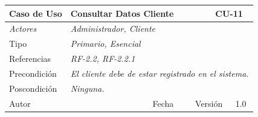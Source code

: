
\begin{table}[H]
    \begin{tabular}{|llllllll|}
    \hline
    \multicolumn{1}{|l|}{\cellcolor[HTML]{F2F2F2}Caso de Uso}           & \multicolumn{5}{l|}{Consultar Datos Cliente}                                                                       & \multicolumn{2}{l|}{\cellcolor[HTML]{E6E6E6}CU-11}             \\ \hline
    \multicolumn{1}{|l|}{{\color[HTML]{808080} \textit{Actores}}}       & \multicolumn{7}{l|}{{\color[HTML]{808080} \textit{Administrador, Cliente}}}                                                                                                      \\ \hline
    \multicolumn{1}{|l|}{Tipo}                                          & \multicolumn{7}{l|}{{\color[HTML]{808080} \textit{Primario, Esencial}}}                                                                                                                           \\ \hline
    \multicolumn{1}{|l|}{Referencias}                                   & \multicolumn{2}{l|}{{\color[HTML]{808080} \textit{RF-2.2, RF-2.2.1}}}                & \multicolumn{5}{l|}{}                                                                                                \\ \hline
    \multicolumn{1}{|l|}{Precondici\'on}                                  & \multicolumn{7}{l|}{{\color[HTML]{808080} \textit{El cliente debe de estar registrado en el sistema.}}}                                                                                                      \\ \hline
    \multicolumn{1}{|l|}{Poscondici\'on}                                  & \multicolumn{7}{l|}{{\color[HTML]{808080} \textit{Ninguna.}}}                                                                                                                                                                             \\ \hline
    \multicolumn{1}{|l|}{Autor}                                         & \multicolumn{1}{l|}{}                         & \multicolumn{2}{l|}{Fecha}             & \multicolumn{1}{l|}{}        & \multicolumn{2}{l|}{Versi\'on}             & 1.0                            \\ \hline

\end{tabular}
\end{table}
